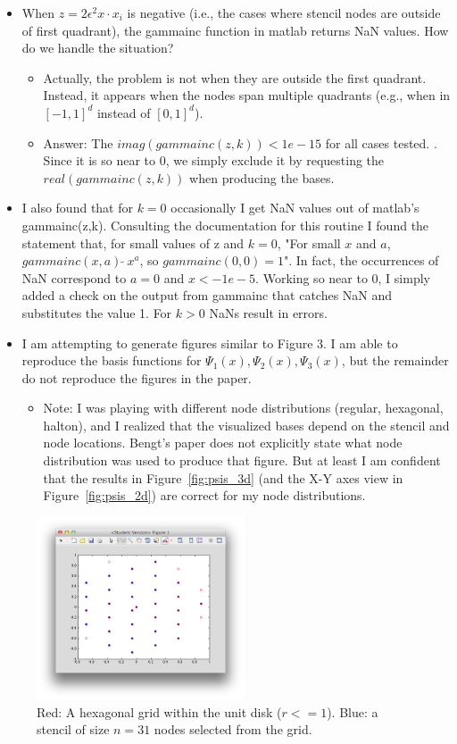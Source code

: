 \documentclass[11pt]{report}
\begin{document}
\begin{itemize}
\item When $z = 2\epsilon^2 x \cdot x_i$ is negative (i.e., the cases where stencil nodes are outside of first quadrant), the gammainc function in matlab returns NaN values. How do we handle the situation? 
\begin{itemize}
\item Actually, the problem is not when they are outside the first quadrant. Instead, it appears when the nodes span multiple quadrants (e.g., when in $[-1,1]^d$ instead of $[0,1]^d$).
\item Answer: The $imag(gammainc(z,k)) < 1e-15$ for all cases tested. . Since it is so near to 0, we simply exclude it by requesting the $real(gammainc(z,k))$ when producing the bases. 
\end{itemize}
\item I also found that for $k=0$ occasionally I get NaN values out of matlab's gammainc(z,k). Consulting the documentation for this routine I found the statement that, for small values of z and $k=0$, "For small $x$ and $a$, $gammainc(x,a) \  \tilde{} \ x^a$, so $gammainc(0,0) = 1$". In fact, the occurrences of NaN correspond to $a=0$ and $x < -1e-5$. Working so near to $0$, I simply added a check on the output from gammainc that catches NaN and substitutes the value 1. For $k>0$ NaNs result in errors.

\item I am attempting to generate figures similar to Figure 3. I am able to reproduce the basis functions for $\Psi_1(x), \Psi_2(x), \Psi_3(x)$, but the remainder do not reproduce the figures in the paper. 
\begin{itemize}
\item Note: I was playing with different node distributions (regular, hexagonal, halton), and I realized that the visualized bases depend on the stencil and node locations. Bengt's paper does not explicitly state what node distribution was used to produce that figure. But at least I am confident that the results in Figure~\ref{fig:psis_3d} (and the X-Y axes view in Figure~\ref{fig:psis_2d}) are correct for my node distributions.
\end{itemize}
\end{itemize}

\begin{figure}
\centering
\includegraphics[width=0.55\textwidth]{./figures/hex_grid_stencil.png}
\caption{Red: A hexagonal grid within the unit disk ($r <= 1$). Blue: a stencil of size $n=31$ nodes selected from the grid. }
\label{fig:hex_grid_stencil}
\end{figure}
\end{document}
